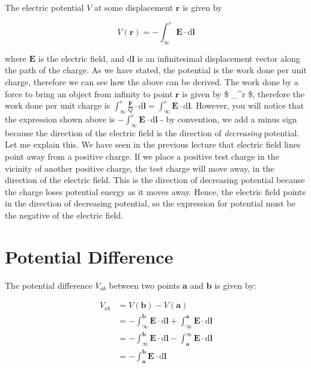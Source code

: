 \documentclass[
  letterpaper,
  DIV=11,
  numbers=noendperiod]{scrreprt}
\begin{document}
The electric potential \(V\) at some displacement
\(\mathrm{\mathbf{r}}\) is given by

\[ V(\mathrm{\mathbf{r}}) = −\int_{\infty}^r \mathrm{\mathbf{E}}\cdot \mathrm{d}\mathrm{\mathbf{l}}\]

where \(\mathrm{\mathbf{E}}\) is the electric field, and
\(\mathrm{d}\mathrm{\mathbf{l}}\) is an infinitesimal displacement
vector along the path of the charge. As we have stated, the potential is
the work done per unit charge, therefore we can see how the above can be
derived. The work done by a force to bring an object from infinity to
point \(\mathrm{\mathbf{r}}\) is given by \$ \int\_\infty\^{}r
 \cdot {}\$, therefore the
work done per unit charge is
\(\int_\infty^r \frac{\mathrm{\mathbf{F}}}{Q} \cdot \mathrm{d}\mathrm{\mathbf{l}}= \int_\infty^r \mathrm{\mathbf{E}}\cdot \mathrm{d}\mathrm{\mathbf{l}}\).
However, you will notice that the expression shown above is
\(- \int_\infty^r \mathrm{\mathbf{E}}\cdot \mathrm{d}\mathrm{\mathbf{l}}\)
- by convention, we add a minus sign because the direction of the
electric field is the direction of \emph{decreasing} potential. Let me
explain this. We have seen in the previous lecture that electric field
lines point away from a positive charge. If we place a positive test
charge in the vicinity of another positive charge, the test charge will
move away, in the direction of the electric field. This is the direction
of decreasing potential because the charge loses potential energy as it
moves away. Hence, the electric field points in the direction of
decreasing potential, so the expression for potential must be the
negative of the electric field.

\section{Potential Difference}\label{potential-difference}

The potential difference \(V_{ab}\) between two points
\(\mathrm{\mathbf{a}}\) and \(\mathrm{\mathbf{b}}\) is given by:

\[
\begin{split} 
V_{ab} & = V(\mathrm{\mathbf{b}}) − V(\mathrm{\mathbf{a}}) \\
& = -\int_{\infty}^{\mathrm{\mathbf{b}}} \mathrm{\mathbf{E}}\cdot \mathrm{d} \mathrm{\mathbf{l}}+ \int_{\infty}^{\mathrm{\mathbf{a}}} \mathrm{\mathbf{E}}\cdot \mathrm{d} \mathrm{\mathbf{l}}\\
& = -\int_{\infty}^{\mathrm{\mathbf{b}}} \mathrm{\mathbf{E}}\cdot \mathrm{d} \mathrm{\mathbf{l}}- \int_{\mathrm{\mathbf{a}}}^{\infty} \mathrm{\mathbf{E}}\cdot \mathrm{d} \mathrm{\mathbf{l}}\\
& = -\int_{\mathrm{\mathbf{a}}}^{\mathrm{\mathbf{b}}} \mathrm{\mathbf{E}}\cdot \mathrm{d} \mathrm{\mathbf{l}}
\end{split}
\]
\end{document}
